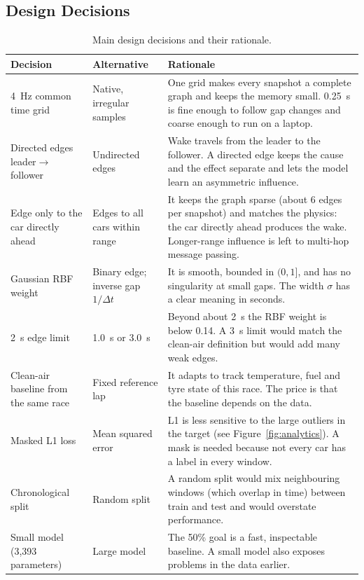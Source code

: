 \documentclass[11pt,a4paper]{article}
\newcommand{\dt}{\Delta t}
\begin{document}
\subsection{Design Decisions}
\begin{table}[H]
\centering
\caption{Main design decisions and their rationale.}
\label{tab:decisions}
\small
\begin{tabularx}{\linewidth}{@{}p{2.6cm}p{3.0cm}X@{}}
\toprule
\textbf{Decision} & \textbf{Alternative} & \textbf{Rationale} \\
\midrule
4~Hz common time grid & Native, irregular samples & One grid makes every snapshot a complete graph and keeps the memory small. 0.25~s is fine enough to follow gap changes and coarse enough to run on a laptop. \\
Directed edges leader$\to$follower & Undirected edges & Wake travels from the leader to the follower. A directed edge keeps the cause and the effect separate and lets the model learn an asymmetric influence. \\
Edge only to the car directly ahead & Edges to all cars within range & It keeps the graph sparse (about 6 edges per snapshot) and matches the physics: the car directly ahead produces the wake. Longer-range influence is left to multi-hop message passing. \\
Gaussian RBF weight & Binary edge; inverse gap $1/\dt$ & It is smooth, bounded in $(0,1]$, and has no singularity at small gaps. The width $\sigma$ has a clear meaning in seconds. \\
2~s edge limit & 1.0~s or 3.0~s & Beyond about 2~s the RBF weight is below 0.14. A 3~s limit would match the clean-air definition but would add many weak edges. \\
Clean-air baseline from the same race & Fixed reference lap & It adapts to track temperature, fuel and tyre state of this race. The price is that the baseline depends on the data. \\
Masked L1 loss & Mean squared error & L1 is less sensitive to the large outliers in the target (see Figure~\ref{fig:analytics}). A mask is needed because not every car has a label in every window. \\
Chronological split & Random split & A random split would mix neighbouring windows (which overlap in time) between train and test and would overstate performance. \\
Small model (3{,}393 parameters) & Large model & The 50\% goal is a fast, inspectable baseline. A small model also exposes problems in the data earlier. \\
\bottomrule
\end{tabularx}
\end{table}
\end{document}
